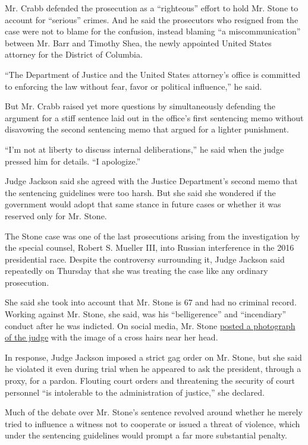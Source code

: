 Mr. Crabb defended the prosecution as a ``righteous'' effort to hold Mr.
Stone to account for ``serious'' crimes. And he said the prosecutors who
resigned from the case were not to blame for the confusion, instead
blaming ``a miscommunication'' between Mr. Barr and Timothy Shea, the
newly appointed United States attorney for the District of Columbia.

``The Department of Justice and the United States attorney's office is
committed to enforcing the law without fear, favor or political
influence,'' he said.

But Mr. Crabb raised yet more questions by simultaneously defending the
argument for a stiff sentence laid out in the office's first sentencing
memo without disavowing the second sentencing memo that argued for a
lighter punishment.

``I'm not at liberty to discuss internal deliberations,'' he said when
the judge pressed him for details. ``I apologize.''

Judge Jackson said she agreed with the Justice Department's second memo
that the sentencing guidelines were too harsh. But she said she wondered
if the government would adopt that same stance in future cases or
whether it was reserved only for Mr. Stone.

The Stone case was one of the last prosecutions arising from the
investigation by the special counsel, Robert S. Mueller III, into
Russian interference in the 2016 presidential race. Despite the
controversy surrounding it, Judge Jackson said repeatedly on Thursday
that she was treating the case like any ordinary prosecution.

She said she took into account that Mr. Stone is 67 and had no criminal
record. Working against Mr. Stone, she said, was his ``belligerence''
and ``incendiary'' conduct after he was indicted. On social media, Mr.
Stone
\href{https://www.nytimes.com/2019/02/19/us/roger-stone-instagram-judge.html}{posted
a photograph of the judge} with the image of a cross hairs near her
head.

In response, Judge Jackson imposed a strict gag order on Mr. Stone, but
she said he violated it even during trial when he appeared to ask the
president, through a proxy, for a pardon. Flouting court orders and
threatening the security of court personnel ``is intolerable to the
administration of justice,'' she declared.

Much of the debate over Mr. Stone's sentence revolved around whether he
merely tried to influence a witness not to cooperate or issued a threat
of violence, which under the sentencing guidelines would prompt a far
more substantial penalty.

